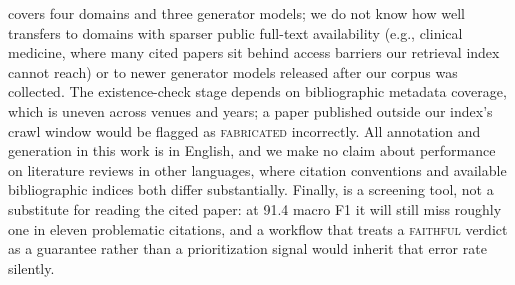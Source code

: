
 covers four domains and three generator models; we do
not know how well  transfers to domains with sparser
public full-text availability (e.g., clinical medicine, where many cited
papers sit behind access barriers our retrieval index cannot reach) or to
newer generator models released after our corpus was collected. The
existence-check stage depends on bibliographic metadata coverage, which is
uneven across venues and years; a paper published outside our index's
crawl window would be flagged as \textsc{fabricated} incorrectly. All
annotation and generation in this work is in English, and we make no claim
about performance on literature reviews in other languages, where citation
conventions and available bibliographic indices both differ substantially.
Finally,  is a screening tool, not a substitute for
reading the cited paper: at 91.4 macro F1 it will still miss roughly one in
eleven problematic citations, and a workflow that treats a
\textsc{faithful} verdict as a guarantee rather than a prioritization
signal would inherit that error rate silently.
